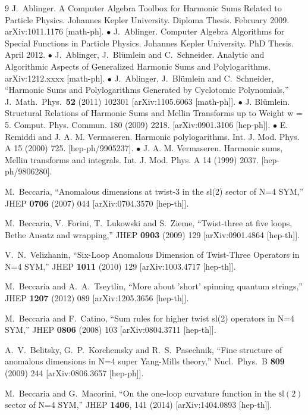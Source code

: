 \documentclass[a4paper,11pt]{article}
\numberwithin{equation}{section}
\begin{document}
\begin{thebibliography} {9}
  J.~Ablinger.
  A Computer Algebra Toolbox for Harmonic Sums Related to Particle Physics. Johannes Kepler University. Diploma Thesis. February 2009.
  arXiv:1011.1176 [math-ph].   $\bullet$
J.~Ablinger. Computer Algebra Algorithms for Special Functions in Particle Physics. Johannes Kepler University. PhD Thesis. April 2012. $\bullet$
J.~Ablinger, J.~Bl\"umlein and C.~Schneider. Analytic and Algorithmic Aspects of Generalized Harmonic Sums and Polylogarithms. arXiv:1212.xxxx [math-ph].
$\bullet$
  J.~Ablinger, J.~Bl\"umlein and C.~Schneider,
  ``Harmonic Sums and Polylogarithms Generated by Cyclotomic Polynomials,''
  J.\ Math.\ Phys.\  {\bf 52} (2011) 102301
[arXiv:1105.6063 [math-ph]].
$\bullet$
J. Bl\"umlein. Structural Relations of Harmonic Sums and Mellin Transforms up to Weight w = 5. Comput. Phys. Commun. 180 (2009) 2218. [arXiv:0901.3106 [hep-ph]].
$\bullet$
E. Remiddi and J. A. M. Vermaseren. Harmonic polylogarithms. Int. J. Mod. Phys. A 15 (2000) 725. [hep-ph/9905237].
$\bullet$
J. A. M. Vermaseren. Harmonic sums, Mellin transforms and integrals. Int. J. Mod. Phys. A 14 (1999) 2037. [hep-ph/9806280].

  M.~Beccaria,
  ``Anomalous dimensions at twist-3 in the sl(2) sector of N=4 SYM,''
  JHEP {\bf 0706} (2007) 044
  [arXiv:0704.3570 [hep-th]].

  M.~Beccaria, V.~Forini, T.~Lukowski and S.~Zieme,
  ``Twist-three at five loops, Bethe Ansatz and wrapping,''
  JHEP {\bf 0903} (2009) 129
  [arXiv:0901.4864 [hep-th]].

  V.~N.~Velizhanin,
  ``Six-Loop Anomalous Dimension of Twist-Three Operators in N=4 SYM,''
  JHEP {\bf 1011} (2010) 129
  [arXiv:1003.4717 [hep-th]].

  M.~Beccaria and A.~A.~Tseytlin,
  ``More about 'short' spinning quantum strings,''
  JHEP {\bf 1207} (2012) 089
  [arXiv:1205.3656 [hep-th]].

  M.~Beccaria and F.~Catino,
  ``Sum rules for higher twist sl(2) operators in N=4 SYM,''
  JHEP {\bf 0806} (2008) 103
  [arXiv:0804.3711 [hep-th]].

  A.~V.~Belitsky, G.~P.~Korchemsky and R.~S.~Pasechnik,
  ``Fine structure of anomalous dimensions in N=4 super Yang-Mills theory,''
  Nucl.\ Phys.\ B {\bf 809} (2009) 244
  [arXiv:0806.3657 [hep-ph]].

  M.~Beccaria and G.~Macorini,
  ``On the one-loop curvature function in the $\mathbb{sl}(2)$ sector of N=4 SYM,''
  JHEP {\bf 1406}, 141 (2014)
  [arXiv:1404.0893 [hep-th]].


\end{thebibliography}
\end{document}
